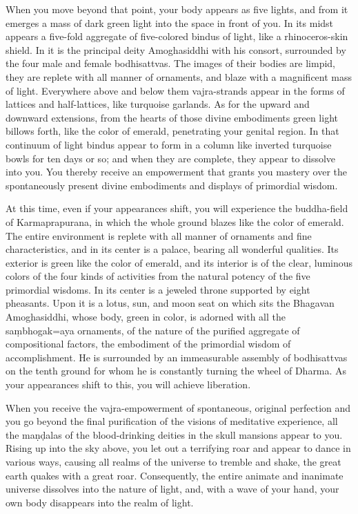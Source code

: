 \documentclass[11pt,twocolumn]{article}
\begin{document}
When you move beyond that point, your body appears as five lights, and
from it emerges a mass of dark green light into the space in front of
you. In its midst appears a five\hyp{}fold aggregate of
five\hyp{}colored bindus of light, like a rhinoceros\hyp{}skin
shield. In it is the principal deity Amoghasiddhi with his consort,
surrounded by the four male and female bodhisattvas. The images of
their bodies are limpid, they are replete with all manner of
ornaments, and blaze with a magnificent mass of light. Everywhere
above and below them vajra\hyp{}strands appear in the forms of
lattices and half\hyp{}lattices, like turquoise garlands. As for the
upward and downward extensions, from the hearts of those divine
embodiments green light billows forth, like the color of emerald,
penetrating your genital region. In that continuum of light bindus
appear to form in a column like inverted turquoise bowls for ten days
or so; and when they are complete, they appear to dissolve into
you. You thereby receive an empowerment that grants you mastery over
the spontaneously present divine embodiments and displays of
primordial wisdom.

At this time, even if your appearances shift, you will experience the
buddha\hyp{}field of Karmaprapurana, in which the whole ground blazes
like the color of emerald. The entire environment is replete with all
manner of ornaments and fine characteristics, and in its center is a
palace, bearing all wonderful qualities. Its exterior is green like
the color of emerald, and its interior is of the clear, luminous
colors of the four kinds of activities from the natural potency of the
five primordial wisdoms. In its center is a jeweled throne supported
by eight pheasants. Upon it is a lotus, sun, and moon seat on which
sits the Bhagavan Amoghasiddhi, whose body, green in color, is adorned
with all the sa\d{m}bhogak\a={a}ya ornaments, of the nature of the
purified aggregate of compositional factors, the embodiment of the
primordial wisdom of accomplishment. He is surrounded by an
immeasurable assembly of bodhisattvas on the tenth ground for whom he
is constantly turning the wheel of Dharma. As your appearances shift
to this, you will achieve liberation.

When you receive the vajra\hyp{}empowerment of spontaneous, original
perfection and you go beyond the final purification of the visions of
meditative experience, all the ma\d{n}\d{d}alas of the
blood\hyp{}drinking deities in the skull mansions appear to
you. Rising up into the sky above, you let out a terrifying roar and
appear to dance in various ways, causing all realms of the universe to
tremble and shake, the great earth quakes with a great
roar. Consequently, the entire animate and inanimate universe
dissolves into the nature of light, and, with a wave of your hand,
your own body disappears into the realm of light.
\end{document}
